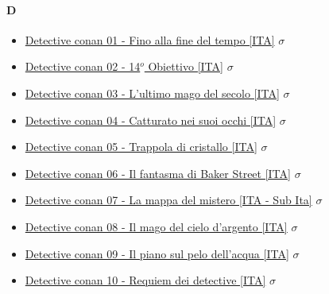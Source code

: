 		\paragraph{D} \hypertarget{FD}{}
			\begin{itemize}
				
				\item \href{https://mega.nz/#!oZcEhLhT!355UkzT4MhGCWnwot9imMiDcX_e10RP973-S7rWCKrY} {Detective conan 01 - Fino alla fine del tempo [ITA]}  $\sigma$   \\
				\item \href{https://mega.nz/#!lIdFwKwJ!1EaUp3-u8ZeKkRrlNT2VOxigkUhHUGxxgTdNqCJTyUU} {Detective conan 02 - 14$ ^{o} $ Obiettivo [ITA]}  $\sigma$   \\
				\item \href{https://mega.nz/#!cVVEyJgL!3rEJGaCJi9rFD5UUDffvYNPD_Kp4KW8--F-BHdCIiNU} {Detective conan 03 - L'ultimo mago del secolo [ITA]}  $\sigma$   \\
				\item \href{https://mega.nz/#!tFN00brQ!JSk9lf5Uux0CW_1ZQNw3jtPpPo96D1YM2Nxm11o4aTo} {Detective conan 04 - Catturato nei suoi occhi [ITA]}  $\sigma$   \\
				\item \href{https://mega.nz/#!pYU1WYrT!15O1V-_M5NfGXNN9c8akHiAU-5h7if5TS0o_qE6yiu0} {Detective conan 05 - Trappola di cristallo [ITA]}  $\sigma$   \\
				\item \href{https://mega.nz/#!UAtlhJZQ!ZgbFnfLYcpqhYZyIdfbFwWuE03z9PdxiXG-5LgSiOVU} {Detective conan 06 - Il fantasma di Baker Street  [ITA]}  $\sigma$   \\
				\item \href{https://mega.nz/#!II9HDJYJ!dPHwExdtwRpEOtd_nJQ4hdUscKq4Jg3jZYBJNSqy92U} {Detective conan 07 - La mappa del mistero  [ITA - Sub Ita]}  $\sigma$   \\
				\item \href{https://mega.nz/#!5V821QYa!WJgTcMEanz9KwBtCEGKW027tITWdwDyD6ghqyEOJbgA} {Detective conan 08 - Il mago del cielo d'argento  [ITA]}  $\sigma$   \\
				\item \href{https://mega.nz/#!5dVBnYQI!Xr37qbfwJcZ3Mf3yrrl5tWFyDnQ4RdwQ-k6Yif0bfgo} {Detective conan 09 - Il piano sul pelo dell'acqua  [ITA]}  $\sigma$   \\
				\item \href{https://mega.nz/#!kQ9wDBTR!yOz1HSF1OcD1P544nv23cEWFpYuPS_ED26GRj0mErZE} {Detective conan 10 - Requiem dei detective  [ITA]}  $\sigma$   \\

\end{itemize}

